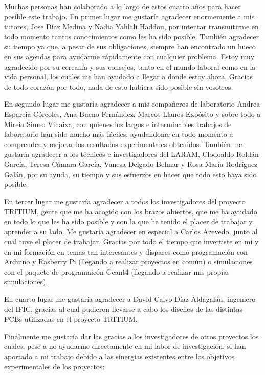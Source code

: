 Muchas personas han colaborado a lo largo de estos cuatro años para hacer posible este trabajo. En primer lugar me gustaría agradecer enormemente a mis tutores, Jose Díaz Medina y Nadia Yahlali Haddou, por intentar transmitirme en todo momento tantos conocimientos como les ha sido posible. También agradecer su tiempo ya que, a pesar de sus obligaciones, siempre han encontrado un hueco en sus agendas para ayudarme rápidamente con cualquier problema. Estoy muy agradecido por su cercanía y sus consejos, tanto en el mundo laboral como en la vida personal, los cuales me han ayudado a llegar a donde estoy ahora. Gracias de todo corazón por todo, nada de esto hubiera sido posible sin vosotros.

En segundo lugar me gustaría agradecer a mis compañeros de laboratorio Andrea Esparcia Córcoles, Ana Bueno Fernández, Marcos Llanos Expósito y sobre todo a Mireia Simeo Vinaixa, con quienes los largos e interminables trabajos de laboratorio han sido mucho más fáciles, ayudandome en todo momento a comprender y mejorar los resultados experimentales obtenidos.  También me gustaría agradecer a los técnicos e investigadores del LARAM, Clodoaldo Roldán García, Teresa Cámara García, Vanesa Delgado Belmar y Rosa María Rodríguez Galán, por su ayuda, su tiempo y sus esfuerzos en hacer que todo esto haya sido posible.

En tercer lugar me gustaría agradecer a todos los investigadores del proyecto TRITIUM, gente que me ha acogido con los brazos abiertos, que me ha ayudado en todo lo que les ha sido posible y con la que he tenido el placer de trabajar y aprender a su lado. Me gustaría agradecer en especial a Carlos Azevedo, junto al cual tuve el placer de trabajar. Gracias por todo el tiempo que invertiste en mi y en mi formación en temas tan interesantes y dispares como programación con Arduino y Rasberry Pi (llegando a realizar proyectos en común) o simulaciones con el paquete de programaicón Geant4 (llegando a realizar mis propias simulaciones).

En cuarto lugar me gustaría agradecer a David Calvo Díaz-Aldagalán, ingeniero del IFIC, gracias al cual pudieron llevarse a cabo los diseños de las distintas PCBs utilizadas en el proyecto TRITIUM.

Finalmente me gustaría dar las gracias a los investigadores de otros proyectos los cuales, pese a no ayudarme directamente en mi labor de investigación, si han aportado a mi trabajo debido a las sinergias existentes entre los objetivos experimentales de los proyectos:

